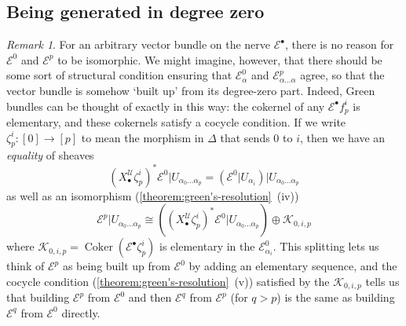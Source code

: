 \documentclass[11pt,fleqn]{article}
\theoremstyle{plain}
\theoremstyle{definition}
\theoremstyle{remark}
\newtheorem{remark}[theorem]{Remark}
\numberwithin{equation}{theorem}
\newcommand{\cover}{\mathcal{U}}
\newcommand{\restricted}{\mathbin{\big\vert}}
\newcommand{\nerve}[1]{X_{#1}^\cover}
\DeclareMathOperator{\Coker}{Coker}
\begin{document}
    \subsection{Being generated in degree zero}

        \begin{remark}\label{remark:explaining-generated-in-degree-zero-definition}
            For an arbitrary vector bundle on the nerve $\mathcal{E}^\bullet$, there is no reason for $\mathcal{E}^0$ and $\mathcal{E}^p$ to be isomorphic.
            We might imagine, however, that there should be some sort of structural condition ensuring that $\mathcal{E}^0_\alpha$ and $\mathcal{E}^p_{\alpha\ldots\alpha}$ agree, so that the vector bundle is somehow `built up' from its degree-zero part.
            Indeed, Green bundles can be thought of exactly in this way: the cokernel of any $\mathcal{E}^\bullet f_p^i$ is elementary, and these cokernels satisfy a cocycle condition.
            If we write $\zeta_p^i\colon[0]\to[p]$ to mean the morphism in $\Delta$ that sends $0$ to $i$, then we have an \emph{equality} of sheaves
            \begin{equation}
            \label{equation:equality-of-sheaves-pullback-by-zeta-double-restriction}
                \left(\nerve{\bullet}\zeta_p^i\right)^*
                \mathcal{E}^0
                \restricted U_{\alpha_0\ldots\alpha_p}
                =
                \left(\mathcal{E}^0 \restricted U_{\alpha_i}\right)
                \restricted U_{\alpha_0\ldots\alpha_p}
            \end{equation}
            as well as an isomorphism (\cref{theorem:green's-resolution}~{(iv)})
            \begin{equation}
            \label{equation:splitting-of-Ep-before-pi-p}
                \mathcal{E}^p \restricted U_{\alpha_0\ldots\alpha_p}
                \cong
                \left( \left(\nerve{\bullet}\zeta_p^i\right)^* \mathcal{E}^0 \restricted U_{\alpha_0\ldots\alpha_p}\right)
                \oplus
                \mathcal{K}_{0,i,p}
            \end{equation}
            where $\mathcal{K}_{0,i,p} = \Coker(\mathcal{E}^\bullet\zeta_p^i)$ is elementary in the $\mathcal{E}_{\alpha_i}^0$.
            This splitting lets us think of $\mathcal{E}^p$ as being built up from $\mathcal{E}^0$ by adding an elementary sequence, and the cocycle condition (\cref{theorem:green's-resolution}~{(v)}) satisfied by the $\mathcal{K}_{0,i,p}$ tells us that building $\mathcal{E}^p$ from $\mathcal{E}^0$ and then $\mathcal{E}^{q}$ from $\mathcal{E}^p$ (for $q>p$) is the same as building $\mathcal{E}^q$ from $\mathcal{E}^0$ directly.
        \end{remark}
\end{document}
